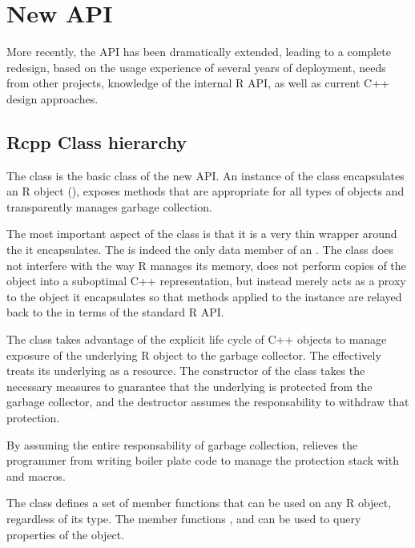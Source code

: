 \section{New  API}
\label{sec:new_rcpp}

More recently, the  API has been dramatically extended, leading to a 
complete redesign, based on the usage experience of several 
years of  deployment, needs from other projects, knowledge 
of the internal R API, as well as current C++ design approaches. 

\subsection{Rcpp Class hierarchy}

The  class is the basic class of the new  API. 
An instance of the  class encapsulates an R object
(), exposes methods that are appropriate for all types 
of objects and transparently manages garbage collection.

The most important aspect of the  class is that it is 
a very thin wrapper around the  it encapsulates. The 
 is indeed the only data member of an . The 
 class does not interfere with the way R manages its 
memory, does not perform copies of the object into a suboptimal 
C++ representation, but instead merely acts as a proxy to the 
object it encapsulates so that methods applied to the 
instance are relayed back to the  in terms of the standard
R API.

The  class takes advantage of the explicit life cycle of 
C++ objects to manage exposure of the underlying R object to the 
garbage collector. The  effectively treats 
its underlying  as a resource.
The constructor of the  class takes 
the necessary measures to guarantee that the underlying 
is protected from the garbage collector, and the destructor
assumes the responsability to withdraw that protection. 

By assuming the entire responsability of garbage collection, 
relieves the programmer from writing boiler plate code to manage
the protection stack with  and  macros.

The  class defines a set of member functions that
can be used on any R object, regardless of its type. The member
functions ,  and  can be 
used to query properties of the object. 

